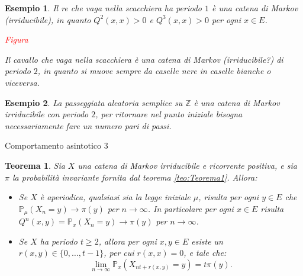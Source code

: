 \documentclass[11pt]{book}
\theoremstyle{Definizione}
\theoremstyle{TeoremaProposizioneLemmaCorollario}
\newtheorem{myteo}{Teorema}[section]
\theoremstyle{OsservazioneNota}
\newtheorem{myes}{Esempio}[section]
\newcommand{\Z}{\mathbb{Z}}
\renewcommand{\P}{\mathbb{P}}
\begin{document}
\begin{myes}
Il re che vaga nella scacchiera ha periodo $1$ è una catena di Markov (irriducibile), in quanto $Q^2(x,x) > 0$ e $Q^3(x,x) > 0$ per ogni $x\in E$.
\begin{center}
\textcolor{red}{Figura}
\end{center}
Il cavallo che vaga nella scacchiera è una catena di Markov (irriducibile?) di periodo $2$, in quanto si muove sempre da caselle nere in caselle bianche o viceversa.
\end{myes}
\begin{myes}
La passeggiata aleatoria semplice su $\Z$ è una catena di Markov irriducibile con periodo $2$, per ritornare nel punto iniziale bisogna necessariamente fare un numero pari di passi.
\end{myes}
\begin{boxteo}{Comportamento asintotico 3}
\begin{myteo}
Sia $X$ una catena di Markov irriducibile e ricorrente positiva, e sia $\pi$ la probabilità invariante fornita dal teorema \textup{\ref{teo:Teorema1}}. Allora:
\begin{itemize}
\item Se $X$ è aperiodica, qualsiasi sia la legge iniziale $\mu$, risulta per ogni $y\in E$ che $\P_\mu(X_n = y) \to \pi(y)$ per $n\to \infty$. In particolare per ogni $x\in E$ risulta $Q^n(x,y) = \P_x(X_n = y) \to \pi(y)$ per $n \to\infty$.
\item Se $X$ ha periodo $t \geq 2$, allora per ogni $x,y \in E$ esiste un $r(x,y)\in \{0,\dots,t-1\}$, per cui $r(x,x) = 0$, e tale che:
$$
\lim_{n \to \infty} \P_x(X_{nt+r(x,y)} = y) = t\pi(y).
$$
\end{itemize}
\end{myteo}
\end{boxteo}
\end{document}
